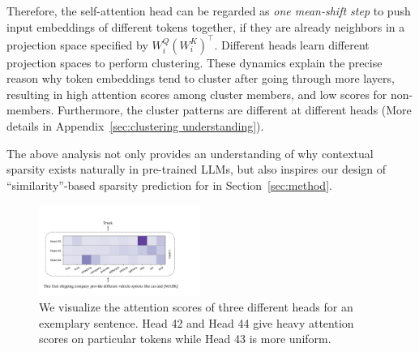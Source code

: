 Therefore, the self-attention head can be regarded as \emph{one mean-shift step} to push input embeddings of different tokens together, if they are already neighbors in a projection space specified by $W_i^Q (W_i^K)^\top $. Different heads learn different projection spaces to perform clustering. These dynamics explain the precise reason why token embeddings tend to cluster after going through more layers, resulting in high attention scores among cluster members, and low scores for non-members. Furthermore, the cluster patterns are different at different heads (More details in Appendix~\ref{sec:clustering understanding}).

The above analysis not only provides an understanding of why contextual sparsity exists naturally in pre-trained LLMs, but also inspires our design of ``similarity''-based sparsity prediction for \name{} in Section~\ref{sec:method}.  


\begin{figure}[]
 \vspace{-2mm}
  \centering
    \includegraphics[width=0.47\textwidth]{figure/Attention_clustering.pdf}
    \vspace{-3mm}
  \caption{ We visualize the attention scores of three different heads for an exemplary sentence. Head 42 and Head 44 give heavy attention scores on particular tokens while Head 43 is more uniform.     }
  \label{fig:head_uniform} 
     \vspace{-4mm}
\end{figure}

